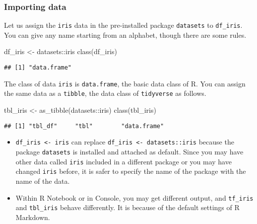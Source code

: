 \documentclass[
]{article}
\newenvironment{Shaded}{\begin{snugshade}}{\end{snugshade}}
\newcommand{\FunctionTok}[1]{\textcolor[rgb]{0.00,0.00,0.00}{#1}}
\newcommand{\NormalTok}[1]{#1}
\newcommand{\OtherTok}[1]{\textcolor[rgb]{0.56,0.35,0.01}{#1}}
\newcommand{\SpecialCharTok}[1]{\textcolor[rgb]{0.00,0.00,0.00}{#1}}
\providecommand{\tightlist}{%
  \setlength{\itemsep}{0pt}\setlength{\parskip}{0pt}}
\begin{document}
\hypertarget{importing-data}{%
\subsubsection{Importing data}\label{importing-data}}

Let us assign the \texttt{iris} data in the pre-installed package
\texttt{datasets} to \texttt{df\_iris}. You can give any name starting
from an alphabet, though there are some rules.

\begin{Shaded}
\begin{Highlighting}[]
\NormalTok{df\_iris }\OtherTok{\textless{}{-}}\NormalTok{ datasets}\SpecialCharTok{::}\NormalTok{iris}
\FunctionTok{class}\NormalTok{(df\_iris)}
\end{Highlighting}
\end{Shaded}

\begin{verbatim}
## [1] "data.frame"
\end{verbatim}

The class of data \texttt{iris} is \texttt{data.frame}, the basic data
class of R. You can assign the same data as a \texttt{tibble}, the data
class of \texttt{tidyverse} as follows.

\begin{Shaded}
\begin{Highlighting}[]
\NormalTok{tbl\_iris }\OtherTok{\textless{}{-}} \FunctionTok{as\_tibble}\NormalTok{(datasets}\SpecialCharTok{::}\NormalTok{iris)}
\FunctionTok{class}\NormalTok{(tbl\_iris)}
\end{Highlighting}
\end{Shaded}

\begin{verbatim}
## [1] "tbl_df"     "tbl"        "data.frame"
\end{verbatim}

\begin{itemize}
\tightlist
\item
  \texttt{df\_iris\ \textless{}-\ iris} can replace
  \texttt{df\_iris\ \textless{}-\ datasets::iris} because the package
  \texttt{datasets} is installed and attached as default. Since you may
  have other data called \texttt{iris} included in a different package
  or you may have changed \texttt{iris} before, it is safer to specify
  the name of the package with the name of the data.
\item
  Within R Notebook or in Console, you may get different output, and
  \texttt{tf\_iris} and \texttt{tbl\_iris} behave differently. It is
  because of the default settings of R Markdown.
\end{itemize}
\end{document}
